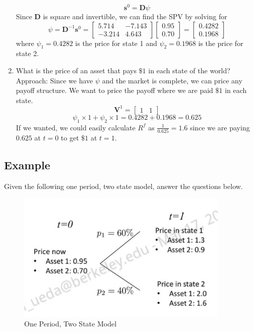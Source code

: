 \documentclass[11pt]{article}
\begin{document}
\begin{enumerate}
    \[ \boldsymbol{s}^0 = \boldsymbol{D}\psi \]
    Since $\boldsymbol{D}$ is square and invertible, we can find the SPV by solving for 
    \[
    \psi = \boldsymbol{D}^{-1}\boldsymbol{s}^0
    = \begin{bmatrix}
        5.714 & -7.143 \\
        -3.214 & 4.643
    \end{bmatrix} 
    \begin{bmatrix}
        0.95 \\ 
        0.70
    \end{bmatrix} =
    \begin{bmatrix}
        0.4282 \\
        0.1968
    \end{bmatrix}
    \]
    where $\psi_1=0.4282$ is the price for state 1 and $\psi_2=0.1968$ is the price for state 2.
    \item What is the price of an asset that pays $\$1$ in each state of the world? \\
    Approach: Since we have $\psi$ and the market is complete, we can price any payoff 
    structure. We want to price the payoff where we are paid $\$1$ in each state. \\
    \[
    \boldsymbol{V}^1 = \begin{bmatrix}
        1 & 1 
    \end{bmatrix}
    \]
    \[
    \psi_1 \times 1 + \psi_2 \times 1 = 0.4282 + 0.1968 = 0.625
    \]
    If we wanted, we could easily calculate $R^f$ as $\frac{1}{0.625} = 1.6$ since we are
    paying $0.625$ at $t=0$ to get $\$1$ at $t=1$.
\end{enumerate}

\subsection{Example}
Given the following one period, two state model, answer the questions below. 
\begin{figure}[H] 
    \centering 
    \includegraphics[width=4in]{imgs/example2.png}
    \caption{One Period, Two State Model}
\end{figure}
\end{document}
